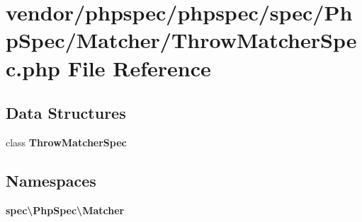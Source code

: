 \section{vendor/phpspec/phpspec/spec/\+Php\+Spec/\+Matcher/\+Throw\+Matcher\+Spec.php File Reference}
\label{_throw_matcher_spec_8php}
\subsection*{Data Structures}
\begin{DoxyCompactItemize}
\item 
class {\bf Throw\+Matcher\+Spec}
\end{DoxyCompactItemize}
\subsection*{Namespaces}
\begin{DoxyCompactItemize}
\item 
 {\bf spec\textbackslash{}\+Php\+Spec\textbackslash{}\+Matcher}
\end{DoxyCompactItemize}
